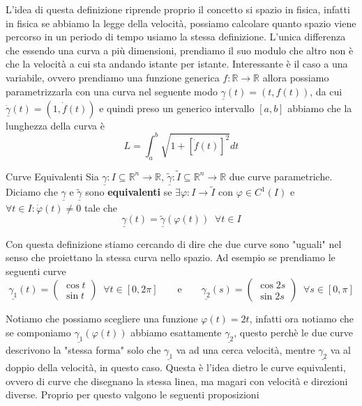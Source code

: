 \documentclass{rapport}
\begin{document}
L'idea di questa definizione riprende proprio il concetto si spazio in fisica, infatti in fisica se abbiamo la legge della velocità, possiamo calcolare quanto spazio viene percorso in un periodo di tempo usiamo la stessa definizione. 
L'unica differenza che essendo una curva a più dimensioni, prendiamo il suo modulo che altro non è che la velocità a cui sta andando istante per istante. Interessante è il caso a una variabile, ovvero prendiamo una funzione generica $f:\mathbb{R}\to\mathbb{R}$ allora possiamo parametrizzarla con una curva nel seguente modo $\underline{\gamma}(t) = (t, f(t))$, da cui $\underline{\dot{\gamma}}(t) = (1, \dot{f}(t))$ e quindi preso un generico intervallo $[a, b]$ abbiamo che la lunghezza della curva è 
\[
L = \int_{a}^{b}\sqrt{1+[\dot{f}(t)]^2} dt
\]


\begin{definizione}{Curve Equivalenti}{}
  Sia $\underline{\gamma}: I \subseteq \mathbb{R}^n\to \mathbb{R}$, $\tilde{\underline{\gamma}}: \tilde{I} \subseteq \mathbb{R}^n\to \mathbb{R}$ due curve parametriche. Diciamo che $\underline{\gamma}$ e $\tilde{\underline{\gamma}}$ sono \textbf{equivalenti} se $\exists \varphi : I \to \tilde{I}$ con $\varphi\in C^1(I)$ e $\forall t \in I: \dot{\varphi}(t) \neq 0$ tale che
  \[
  \underline{\gamma}(t) = \tilde{\underline{\gamma}}(\varphi(t)) \;\; \forall t \in I
  \]
\end{definizione}

Con questa definizione stiamo cercando di dire che due curve sono "uguali" nel senso che proiettano la stessa curva nello spazio. Ad esempio se prendiamo le seguenti curve 
\[
\underline{\gamma_1}(t) =  \begin{pmatrix}
  \cos t \\
  \sin t
\end{pmatrix} \;\; \forall t \in [0, 2\pi]
\qquad \text{e} \qquad
\underline{\gamma_2}(s) =  \begin{pmatrix}
  \cos 2s \\
  \sin 2s
\end{pmatrix} \;\; \forall s \in [0, \pi]
\]


Notiamo che possiamo scegliere una funzione $\varphi(t) = 2t$, infatti ora notiamo che se componiamo $\underline{\gamma_1}(\varphi(t))$ abbiamo esattamente $\underline{\gamma_2}$, questo perchè le due curve descrivono la "stessa forma" solo che $\underline{\gamma_1}$ va ad una cerca velocità, mentre $\underline{\gamma_2}$ va al doppio della velocità, in questo caso. Questa è l'idea dietro le curve equivalenti, ovvero di curve che disegnano la stessa linea, ma magari con velocità e direzioni diverse. Proprio per questo valgono le seguenti proposizioni 
\end{document}
